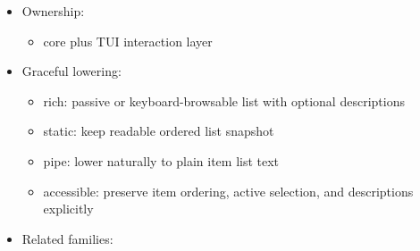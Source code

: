 \begin{itemize}
  \begin{itemize}
  \tightlist
  \item
    list rows should begin with the most distinguishing label or identifier
  \item
    descriptions should help the scan task, not turn each row into a paragraph
  \item
    use \texttt{b\allowbreak{}r\allowbreak{}o\allowbreak{}w\allowbreak{}s\allowbreak{}a\allowbreak{}b\allowbreak{}l\allowbreak{}e\allowbreak{}L\allowbreak{}i\allowbreak{}s\allowbreak{}t\allowbreak{}S\allowbreak{}u\allowbreak{}r\allowbreak{}f\allowbreak{}a\allowbreak{}c\allowbreak{}e\allowbreak{}(\allowbreak{})} when the list belongs inside a rich TUI region and should share viewport masking semantics with pagers and focus panes; keep \texttt{b\allowbreak{}r\allowbreak{}o\allowbreak{}w\allowbreak{}s\allowbreak{}a\allowbreak{}b\allowbreak{}l\allowbreak{}e\allowbreak{}L\allowbreak{}i\allowbreak{}s\allowbreak{}t\allowbreak{}(\allowbreak{})} as the explicit text-lowering path
  \item
    if the next user action is ``run a command'' rather than ``inspect a record,'' move up to \texttt{c\allowbreak{}o\allowbreak{}m\allowbreak{}m\allowbreak{}a\allowbreak{}n\allowbreak{}d\allowbreak{}P\allowbreak{}a\allowbreak{}l\allowbreak{}e\allowbreak{}t\allowbreak{}t\allowbreak{}e\allowbreak{}(\allowbreak{})} instead of making the list pretend to be an action launcher
  \end{itemize}
\item
  Ownership:

  \begin{itemize}
  \tightlist
  \item
    core plus TUI interaction layer
  \end{itemize}
\item
  Graceful lowering:

  \begin{itemize}
  \tightlist
  \item
    rich: passive or keyboard-browsable list with optional descriptions
  \item
    static: keep readable ordered list snapshot
  \item
    pipe: lower naturally to plain item list text
  \item
    accessible: preserve item ordering, active selection, and descriptions explicitly
  \end{itemize}
\item
  Related families:


\end{itemize}

